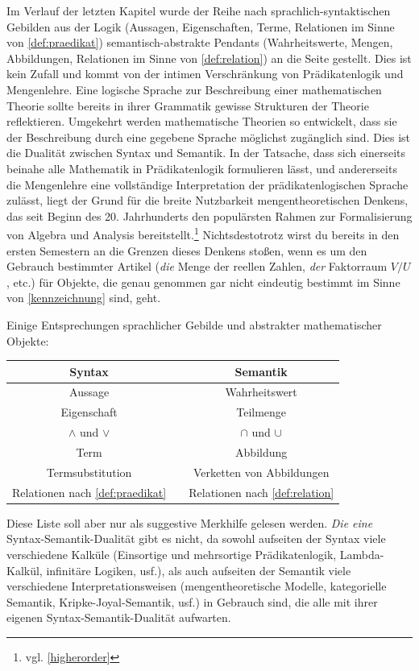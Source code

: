 \begin{bem} \label{syntaxvssemantik} 
    Im Verlauf der letzten Kapitel wurde der Reihe nach sprachlich-syntaktischen Gebilden aus der Logik (Aussagen, Eigenschaften, Terme, Relationen im Sinne von \cref{def:praedikat}) semantisch-abstrakte Pendants (Wahrheitswerte, Mengen, Abbildungen, Relationen im Sinne von \cref{def:relation}) an die Seite gestellt. Dies ist kein Zufall und kommt von der intimen Verschränkung von Prädikatenlogik und Mengenlehre. Eine logische Sprache zur Beschreibung einer mathematischen Theorie sollte bereits in ihrer Grammatik gewisse Strukturen der Theorie reflektieren. Umgekehrt werden mathematische Theorien so entwickelt, dass sie der Beschreibung durch eine gegebene Sprache möglichst zugänglich sind. Dies ist die Dualität zwischen Syntax und Semantik. In der Tatsache, dass sich einerseits beinahe alle Mathematik in Prädikatenlogik formulieren lässt, und andererseits die Mengenlehre eine vollständige Interpretation der prädikatenlogischen Sprache zulässt, liegt der Grund für die breite Nutzbarkeit mengentheoretischen Denkens, das seit Beginn des 20. Jahrhunderts den populärsten Rahmen zur Formalisierung von Algebra und Analysis bereitstellt.\footnote{vgl. \cref{higherorder}} Nichtsdestotrotz wirst du bereits in den ersten Semestern an die Grenzen dieses Denkens stoßen, wenn es um den Gebrauch bestimmter Artikel (\emph{die} Menge der reellen Zahlen, \emph{der} Faktorraum $V/U$, etc.) für Objekte, die genau genommen gar nicht eindeutig bestimmt im Sinne von \cref{kennzeichnung} sind, geht.

    Einige Entsprechungen sprachlicher Gebilde und abstrakter mathematischer Objekte:
    \begin{center}
    \begin{tabular}{ccc}
        Syntax &\phantom{a}& Semantik \\
        \midrule
        Aussage && Wahrheitswert \\
        Eigenschaft && Teilmenge \\
        $\land$ und $\lor$ && $\cap$ und $\cup$ \\
        Term && Abbildung \\
        Termsubstitution && Verketten von Abbildungen \\
        Relationen nach \cref{def:praedikat} && Relationen nach \cref{def:relation} \\
    \end{tabular}
    \end{center}
    Diese Liste soll aber nur als suggestive Merkhilfe gelesen werden. \emph{Die eine} Syntax-Semantik-Dualität gibt es nicht, da sowohl aufseiten der Syntax viele verschiedene Kalküle (Einsortige und mehrsortige Prädikatenlogik, Lambda-Kalkül, infinitäre Logiken, usf.), als auch aufseiten der Semantik viele verschiedene Interpretationsweisen (mengentheoretische Modelle, kategorielle Semantik, Kripke-Joyal-Semantik, usf.) in Gebrauch sind, die alle mit ihrer eigenen Syntax-Semantik-Dualität aufwarten.
\end{bem}


